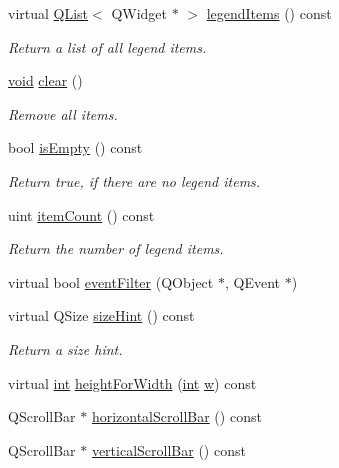 \begin{DoxyCompactItemize}
\item 
virtual \hyperlink{class_q_list}{Q\-List}$<$ Q\-Widget $\ast$ $>$ \hyperlink{class_qwt_legend_ab0eb76b6c4f50257ba0219e57332045e}{legend\-Items} () const 
\begin{DoxyCompactList}\small\item\em Return a list of all legend items. \end{DoxyCompactList}\item 
\hyperlink{group___u_a_v_objects_plugin_ga444cf2ff3f0ecbe028adce838d373f5c}{void} \hyperlink{class_qwt_legend_a084177665b32798903176de57d962c6e}{clear} ()
\begin{DoxyCompactList}\small\item\em Remove all items. \end{DoxyCompactList}\item 
bool \hyperlink{class_qwt_legend_a6ff50cb1e388a7da2a59709eef83be20}{is\-Empty} () const 
\begin{DoxyCompactList}\small\item\em Return true, if there are no legend items. \end{DoxyCompactList}\item 
uint \hyperlink{class_qwt_legend_ac8d57d90bb41aa2d69c7411a20febdda}{item\-Count} () const 
\begin{DoxyCompactList}\small\item\em Return the number of legend items. \end{DoxyCompactList}\item 
virtual bool \hyperlink{class_qwt_legend_ade86e158b8254fe76d42e85f9808c827}{event\-Filter} (Q\-Object $\ast$, Q\-Event $\ast$)
\item 
virtual Q\-Size \hyperlink{class_qwt_legend_a2517a7d9d78ab7a3892125ecf755f33f}{size\-Hint} () const 
\begin{DoxyCompactList}\small\item\em Return a size hint. \end{DoxyCompactList}\item 
virtual \hyperlink{ioapi_8h_a787fa3cf048117ba7123753c1e74fcd6}{int} \hyperlink{class_qwt_legend_a273ec258209c42f57b154ff4da61e1d0}{height\-For\-Width} (\hyperlink{ioapi_8h_a787fa3cf048117ba7123753c1e74fcd6}{int} \hyperlink{glext_8h_ac1795f3b2fee217274b85c2750e1a889}{w}) const 
\item 
Q\-Scroll\-Bar $\ast$ \hyperlink{class_qwt_legend_a40dab44d47921da18a925e8fcc8d6870}{horizontal\-Scroll\-Bar} () const 
\item 
Q\-Scroll\-Bar $\ast$ \hyperlink{class_qwt_legend_a494758e3d7ab688c59989da52e7e97cf}{vertical\-Scroll\-Bar} () const 
\end{DoxyCompactItemize}
